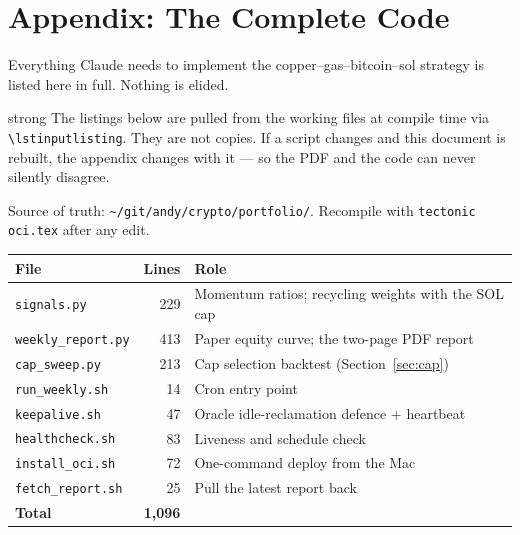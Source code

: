 \documentclass[11pt,a4paper]{article}
\begin{document}
\newpage
\part{Appendix: The Complete Code}

Everything Claude needs to implement the copper--gas--bitcoin--sol
strategy is listed here in full. Nothing is elided.

\begin{resultbox}{strong}
The listings below are pulled from the working files at compile time
via \texttt{\textbackslash lstinputlisting}. They are not copies. If a
script changes and this document is rebuilt, the appendix changes with
it --- so the PDF and the code can never silently disagree.

\vspace{0.5em}
Source of truth:
\texttt{\textasciitilde/git/andy/crypto/portfolio/}.
Recompile with \texttt{tectonic oci.tex} after any edit.
\end{resultbox}

\vspace{0.5em}
\begin{tabular}{@{}p{3.6cm}rp{9.4cm}@{}}
    \toprule
    \textbf{File} & \textbf{Lines} & \textbf{Role} \\
    \midrule
    \texttt{signals.py}        & 229 & Momentum ratios; recycling weights with the SOL cap \\
    \texttt{weekly\_report.py} & 413 & Paper equity curve; the two-page PDF report \\
    \texttt{cap\_sweep.py}     & 213 & Cap selection backtest (Section~\ref{sec:cap}) \\
    \texttt{run\_weekly.sh}    & 14  & Cron entry point \\
    \texttt{keepalive.sh}      & 47  & Oracle idle-reclamation defence + heartbeat \\
    \texttt{healthcheck.sh}    & 83  & Liveness and schedule check \\
    \texttt{install\_oci.sh}   & 72  & One-command deploy from the Mac \\
    \texttt{fetch\_report.sh}  & 25  & Pull the latest report back \\
    \midrule
    \textbf{Total}             & \textbf{1{,}096} & \\
    \bottomrule
\end{tabular}
\end{document}
